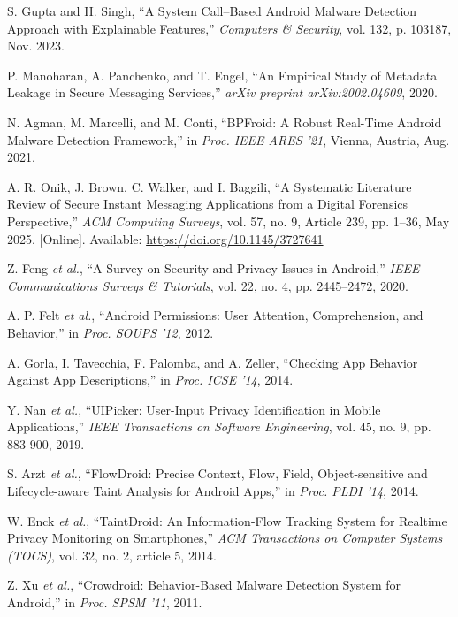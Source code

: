 \documentclass[a4paper,12pt]{report}
\begin{document}
\begin{thebibliography}{99}
S. Gupta and H. Singh, “A System Call–Based Android Malware Detection Approach with Explainable Features,” \emph{Computers \& Security}, vol. 132, p. 103187, Nov. 2023.

P. Manoharan, A. Panchenko, and T. Engel, “An Empirical Study of Metadata Leakage in Secure Messaging Services,” \emph{arXiv preprint arXiv:2002.04609}, 2020.

N. Agman, M. Marcelli, and M. Conti, “BPFroid: A Robust Real-Time Android Malware Detection Framework,” in \emph{Proc. IEEE ARES ’21}, Vienna, Austria, Aug. 2021.

A. R. Onik, J. Brown, C. Walker, and I. Baggili, “A Systematic Literature Review of Secure Instant Messaging Applications from a Digital Forensics Perspective,” \emph{ACM Computing Surveys}, vol. 57, no. 9, Article 239, pp. 1–36, May 2025. [Online]. Available: \url{https://doi.org/10.1145/3727641}

Z. Feng \emph{et al.}, “A Survey on Security and Privacy Issues in Android,” \emph{IEEE Communications Surveys \& Tutorials}, vol. 22, no. 4, pp. 2445–2472, 2020.

A. P. Felt \emph{et al.}, “Android Permissions: User Attention, Comprehension, and Behavior,” in \emph{Proc. SOUPS '12}, 2012.

A. Gorla, I. Tavecchia, F. Palomba, and A. Zeller, “Checking App Behavior Against App Descriptions,” in \emph{Proc. ICSE '14}, 2014.

Y. Nan \emph{et al.}, “UIPicker: User-Input Privacy Identification in Mobile Applications,” \emph{IEEE Transactions on Software Engineering}, vol. 45, no. 9, pp. 883-900, 2019.

S. Arzt \emph{et al.}, “FlowDroid: Precise Context, Flow, Field, Object-sensitive and Lifecycle-aware Taint Analysis for Android Apps,” in \emph{Proc. PLDI '14}, 2014.

W. Enck \emph{et al.}, “TaintDroid: An Information-Flow Tracking System for Realtime Privacy Monitoring on Smartphones,” \emph{ACM Transactions on Computer Systems (TOCS)}, vol. 32, no. 2, article 5, 2014.

Z. Xu \emph{et al.}, “Crowdroid: Behavior-Based Malware Detection System for Android,” in \emph{Proc. SPSM '11}, 2011.


\end{thebibliography}
\end{document}
